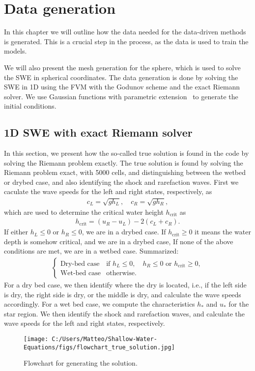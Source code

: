 \chapter{Data generation}\label{ch:method}
In this chapter we will outline how the data needed for the data-driven methods is generated.
This is a crucial step in the process, as the data is used to train the models. 

We will also present the mesh generation for the sphere, which is used to solve the SWE in spherical coordinates.
The data generation is done by solving the SWE in 1D using the FVM with the Godunov scheme and the exact Riemann solver.
We use Gaussian functions with parametric extension~\cite{Gaussian} to generate the initial conditions.


\section{1D SWE with exact Riemann solver}
In this section, we present how the so-called true solution is found in the code by solving the Riemann problem exactly.
The true solution is found by solving the Riemann problem exact, with 5000 cells, and distinguishing between the wetbed or drybed case, and also identifying the shock and rarefaction waves.
First we caculate the wave speeds for the left and right states, respectively, as
\begin{align*}
    c_L = \sqrt{g h_L}, \quad c_R = \sqrt{g h_R},
\end{align*}
which are used to determine the critical water height $h_{\text{crit}}$ as
\begin{align*}
    h_{\text{crit}} = (u_R - u_L) - 2(c_L + c_R).
\end{align*}
If either $h_L \leq 0$ or $h_R \leq 0$, we are in a drybed case.
If $h_{\text{crit}} \geq 0$ it means the water depth is somehow critical, and we are in a drybed case,
If none of the above conditions are met, we are in a wetbed case.
Summarized:
\begin{align*}
    \begin{cases}
        \text{Dry-bed case} & \text{if }  h_L \leq 0, \quad  h_R \leq 0 \text{ or } h_{\text{crit}} \geq 0, \\
        \text{Wet-bed case} & \text{otherwise}.
    \end{cases}
\end{align*}
For a dry bed case, we then identify where the dry is located, i.e., if the left side is dry, the right side is dry, or the middle is dry, and calculate the wave speeds accordingly.
For a wet bed case, we compute the characteristics $h_*$ and $u_*$ for the star region.
We then identify the shock and rarefaction waves, and calculate the wave speeds for the left and right states, respectively.
\begin{figure}[H]
    \centering
    \texttt{[image: C:/Users/Matteo/Shallow-Water-Equations/figs/flowchart\_true\_solution.jpg]}
    \caption{Flowchart for generating the solution.}\label{fig:flowchart_true_solution}
\end{figure}

